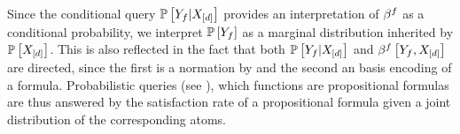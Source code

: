 Since the conditional query $\mathbb{P}\left[Y_{f}|X_{[d]}\right]$ provides an interpretation of $\beta^{f}$ as a conditional probability, we interpret $\mathbb{P}\left[Y_{f}\right]$ as a marginal distribution inherited by $\mathbb{P}\left[X_{[d]}\right]$.
This is also reflected in the fact that both $\mathbb{P}\left[Y_{f}|X_{[d]}\right]$ and $\beta^{f}\left[Y_{f},X_{[d]}\right]$ are directed, since the first is a normation by  and the second an basis encoding of a formula.
Probabilistic queries (see ), which functions are propositional formulas are thus answered by the satisfaction rate of a propositional formula given a joint distribution of the corresponding atoms.


%	



%		
%

